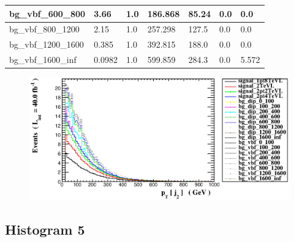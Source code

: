 \documentclass[a4paper, 10pt]{article}
\begin{document}
\begin{table}[H]
\begin{center}
\begin{tabular}{|m{23.0mm}|m{23.0mm}|m{18.0mm}|m{19.0mm}|m{19.0mm}|m{19.0mm}|m{19.0mm}|}
      \hline
      {\cellcolor{white}         bg\_vbf\_600\_800}& {\cellcolor{white}         3.66}& {\cellcolor{white}         1.0}& {\cellcolor{white}         186.868}& {\cellcolor{white}         85.24}& {\cellcolor{green}         0.0}& {\cellcolor{green}         0.0}\\
      \hline
      {\cellcolor{white}         bg\_vbf\_800\_1200}& {\cellcolor{white}         2.15}& {\cellcolor{white}         1.0}& {\cellcolor{white}         257.298}& {\cellcolor{white}         127.5}& {\cellcolor{green}         0.0}& {\cellcolor{green}         0.0}\\
      \hline
      {\cellcolor{white}         bg\_vbf\_1200\_1600}& {\cellcolor{white}         0.385}& {\cellcolor{white}         1.0}& {\cellcolor{white}         392.815}& {\cellcolor{white}         188.0}& {\cellcolor{green}         0.0}& {\cellcolor{green}         0.0}\\
      \hline
      {\cellcolor{white}         bg\_vbf\_1600\_inf}& {\cellcolor{white}         0.0982}& {\cellcolor{white}         1.0}& {\cellcolor{white}         599.859}& {\cellcolor{white}         284.3}& {\cellcolor{orange}         0.0}& {\cellcolor{orange}         5.572}\\
\hline
    \end{tabular}
  \end{center}
\end{table}

\begin{figure}[H]
  \begin{center}
    \includegraphics[scale=0.45]{selection_3.eps}\\
\caption{   }
  \end{center}
\end{figure}
      \newpage
\subsection{ Histogram 5}
\end{document}
